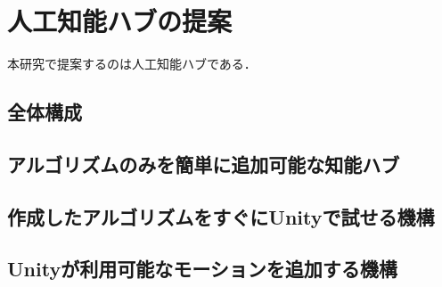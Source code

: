 
\section{人工知能ハブの提案}
本研究で提案するのは人工知能ハブである．
\subsection{全体構成}
\subsection{アルゴリズムのみを簡単に追加可能な知能ハブ}
\subsection{作成したアルゴリズムをすぐにUnityで試せる機構}
\subsection{Unityが利用可能なモーションを追加する機構}
